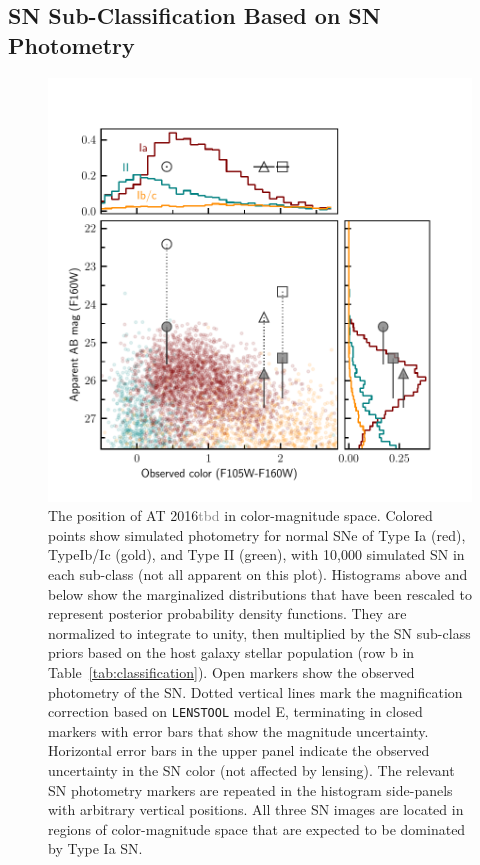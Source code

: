 \documentclass[12pt,dvipsnames]{article}
\def\SNABC{AT 2016{\textcolor{Gray}{tbd}}\xspace}
\def\lenstool{{\tt LENSTOOL}\xspace}
\begin{document}
\subsection*{SN Sub-Classification Based on SN Photometry}

\begin{figure}
    \centering
    \includegraphics{Paper/Figures/colormag_classification_supplement.pdf}
    \caption{The position of \SNABC in color-magnitude space.
    Colored points show simulated photometry for normal SNe of Type Ia (red), TypeIb/Ic (gold), and Type II (green), with 10,000 simulated SN in each sub-class (not all apparent on this plot).  Histograms above and below show the marginalized distributions that have been rescaled to represent posterior probability density functions. They are normalized to integrate to unity, then multiplied by the SN sub-class priors based on the host galaxy stellar population (row b in Table~\ref{tab:classification}).  Open markers show the observed photometry of the SN. Dotted vertical lines mark the magnification correction based on \lenstool model E, terminating in closed markers with error bars that show the magnitude uncertainty.  Horizontal error bars in the upper panel indicate the observed uncertainty in 
    the SN color (not affected by lensing).  The relevant SN photometry markers are repeated in the histogram side-panels with arbitrary vertical positions.  All three SN images are located in regions of color-magnitude space that are expected to be dominated by Type Ia SN.}
    \label{fig:colormag_classification_supplement}
\end{figure}
\end{document}
